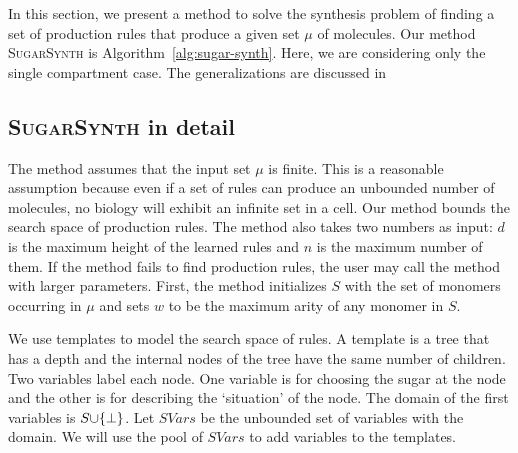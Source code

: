In this section, we present a method to solve the synthesis problem of finding
a set of production rules that produce a given set $\mu$ of molecules.
Our method \textsc{SugarSynth} is Algorithm~\ref{alg:sugar-synth}.
Here, we are considering only the single compartment case.
The generalizations are discussed in





\subsection{\textsc{SugarSynth} in detail}

The method assumes that the input set $\mu$ is finite.
This is a reasonable assumption because
even if a set of rules can produce
an unbounded number of molecules,
no biology will exhibit an infinite set in a cell.
Our method
bounds the search space of production rules.
The method also takes two numbers as input:
$d$ is the maximum height of the learned rules
and 
$n$ is the maximum number of them.
If the method fails to find production rules,
the user may call the method with larger parameters.
First, the method initializes $S$ with the set of monomers occurring
in $\mu$
and sets $w$ to be the maximum arity of any monomer in $S$.


We use templates to model the search space of rules.
A template is a tree that has a depth and
the internal nodes of the tree have the same number of children.
Two variables label each node. %
One variable is for choosing the sugar at the node and the other is for describing
the `situation' of the node.
The domain of the first variables is $S {\cup} \{\bot\}$.
Let $SVars$ be the unbounded set of variables with the domain.
We will use the pool of $SVars$ to add variables to the templates.



